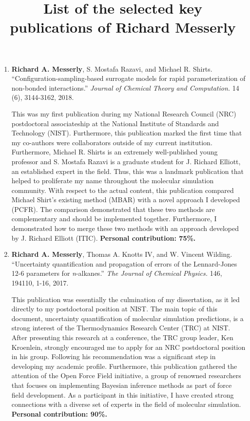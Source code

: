 \documentclass[12pt]{article}
\title{List of the selected key publications of Richard Messerly}
\date{}
\begin{document}
\maketitle


\begin{enumerate}
	
\item \textbf{Richard A. Messerly}, S. Mostafa Razavi, and Michael R. Shirts. ``Configuration-sampling-based surrogate models for rapid parameterization of non-bonded interactions.'' \textit{Journal of Chemical Theory and Computation.} 14 (6), 3144-3162, 2018.

This was my first publication during my National Research Council (NRC) postdoctoral associateship at the National Institute of Standards and Technology (NIST). Furthermore, this publication marked the first time that my co-authors were collaborators outside of my current institution. Furthermore, Michael R. Shirts is an extremely well-published young professor and S. Mostafa Razavi is a graduate student for J. Richard Elliott, an established expert in the field. Thus, this was a landmark publication that helped to proliferate my name throughout the molecular simulation community. With respect to the actual content, this publication compared Michael Shirt's existing method (MBAR) with a novel approach I developed (PCFR). The comparison demonstrated that these two methods are complementary and should be implemented together. Furthermore, I demonstrated how to merge these two methods with an approach developed by J. Richard Elliott (ITIC). \textbf{Personal contribution: 75\%.}

\item \textbf{Richard A. Messerly}, Thomas A. Knotts IV, and W. Vincent Wilding. ``Uncertainty quantification and propagation of errors of the Lennard-Jones 12-6 parameters for \textit{n}-alkanes.'' \textit{The Journal of Chemical Physics.} 146, 194110, 1-16, 2017.

This publication was essentially the culmination of my dissertation, as it led directly to my postdoctoral position at NIST. The main topic of this document, uncertainty quantification of molecular simulation predictions, is a strong interest of the Thermodynamics Research Center (TRC) at NIST. After presenting this research at a conference, the TRC group leader, Ken Kroenlein, strongly encouraged me to apply for an NRC postdoctoral position in his group. Following his recommendation was a significant step in developing my academic profile. Furthermore, this publication gathered the attention of the Open Force Field initiative, a group of renowned researchers that focuses on implementing Bayesian inference methods as part of force field development. As a participant in this initiative, I have created strong connections with a diverse set of experts in the field of molecular simulation. \textbf{Personal contribution: 90\%.}


\end{enumerate}
\end{document}
